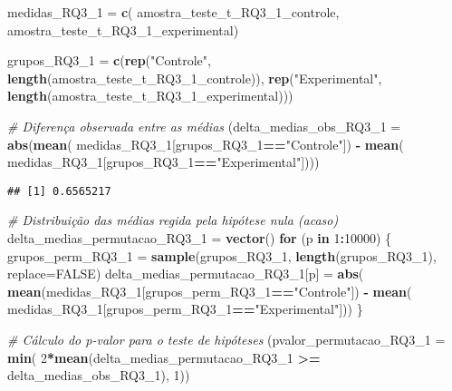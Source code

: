 \documentclass[
]{article}
\newenvironment{Shaded}{\begin{snugshade}}{\end{snugshade}}
\newcommand{\AttributeTok}[1]{\textcolor[rgb]{0.13,0.29,0.53}{#1}}
\newcommand{\CommentTok}[1]{\textcolor[rgb]{0.56,0.35,0.01}{\textit{#1}}}
\newcommand{\ConstantTok}[1]{\textcolor[rgb]{0.56,0.35,0.01}{#1}}
\newcommand{\ControlFlowTok}[1]{\textcolor[rgb]{0.13,0.29,0.53}{\textbf{#1}}}
\newcommand{\DecValTok}[1]{\textcolor[rgb]{0.00,0.00,0.81}{#1}}
\newcommand{\FunctionTok}[1]{\textcolor[rgb]{0.13,0.29,0.53}{\textbf{#1}}}
\newcommand{\NormalTok}[1]{#1}
\newcommand{\OtherTok}[1]{\textcolor[rgb]{0.56,0.35,0.01}{#1}}
\newcommand{\SpecialCharTok}[1]{\textcolor[rgb]{0.81,0.36,0.00}{\textbf{#1}}}
\newcommand{\StringTok}[1]{\textcolor[rgb]{0.31,0.60,0.02}{#1}}
\begin{document}
\begin{Shaded}
\begin{Highlighting}[]
\NormalTok{medidas\_RQ3\_1 }\OtherTok{=} \FunctionTok{c}\NormalTok{(}
\NormalTok{    amostra\_teste\_t\_RQ3\_1\_controle, amostra\_teste\_t\_RQ3\_1\_experimental)}

\NormalTok{grupos\_RQ3\_1 }\OtherTok{=} \FunctionTok{c}\NormalTok{(}\FunctionTok{rep}\NormalTok{(}\StringTok{"Controle"}\NormalTok{, }\FunctionTok{length}\NormalTok{(amostra\_teste\_t\_RQ3\_1\_controle)),}
\FunctionTok{rep}\NormalTok{(}\StringTok{"Experimental"}\NormalTok{, }\FunctionTok{length}\NormalTok{(amostra\_teste\_t\_RQ3\_1\_experimental)))}

\CommentTok{\# Diferença observada entre as médias}
\NormalTok{(}\AttributeTok{delta\_medias\_obs\_RQ3\_1 =} \FunctionTok{abs}\NormalTok{(}\FunctionTok{mean}\NormalTok{(}
\NormalTok{    medidas\_RQ3\_1[grupos\_RQ3\_1}\SpecialCharTok{==}\StringTok{"Controle"}\NormalTok{]) }\SpecialCharTok{{-}} \FunctionTok{mean}\NormalTok{(}
\NormalTok{        medidas\_RQ3\_1[grupos\_RQ3\_1}\SpecialCharTok{==}\StringTok{"Experimental"}\NormalTok{])))}
\end{Highlighting}
\end{Shaded}

\begin{verbatim}
## [1] 0.6565217
\end{verbatim}

\begin{Shaded}
\begin{Highlighting}[]
\CommentTok{\# Distribuição das médias regida pela hipótese nula (acaso)}
\NormalTok{delta\_medias\_permutacao\_RQ3\_1 }\OtherTok{=} \FunctionTok{vector}\NormalTok{()}
\ControlFlowTok{for}\NormalTok{ (p }\ControlFlowTok{in} \DecValTok{1}\SpecialCharTok{:}\DecValTok{10000}\NormalTok{)}
\NormalTok{\{}
\NormalTok{  grupos\_perm\_RQ3\_1 }\OtherTok{=} \FunctionTok{sample}\NormalTok{(grupos\_RQ3\_1, }\FunctionTok{length}\NormalTok{(grupos\_RQ3\_1), }\AttributeTok{replace=}\ConstantTok{FALSE}\NormalTok{)}
\NormalTok{  delta\_medias\_permutacao\_RQ3\_1[p] }\OtherTok{=} \FunctionTok{abs}\NormalTok{(}
    \FunctionTok{mean}\NormalTok{(medidas\_RQ3\_1[grupos\_perm\_RQ3\_1}\SpecialCharTok{==}\StringTok{"Controle"}\NormalTok{]) }\SpecialCharTok{{-}} \FunctionTok{mean}\NormalTok{(}
\NormalTok{        medidas\_RQ3\_1[grupos\_perm\_RQ3\_1}\SpecialCharTok{==}\StringTok{"Experimental"}\NormalTok{]))}
\NormalTok{\}}

\CommentTok{\# Cálculo do p{-}valor para o teste de hipóteses}
\NormalTok{(}\AttributeTok{pvalor\_permutacao\_RQ3\_1 =} \FunctionTok{min}\NormalTok{(}
    \DecValTok{2}\SpecialCharTok{*}\FunctionTok{mean}\NormalTok{(delta\_medias\_permutacao\_RQ3\_1 }\SpecialCharTok{\textgreater{}=}\NormalTok{ delta\_medias\_obs\_RQ3\_1), }\DecValTok{1}\NormalTok{))}
\end{Highlighting}
\end{Shaded}
\end{document}
